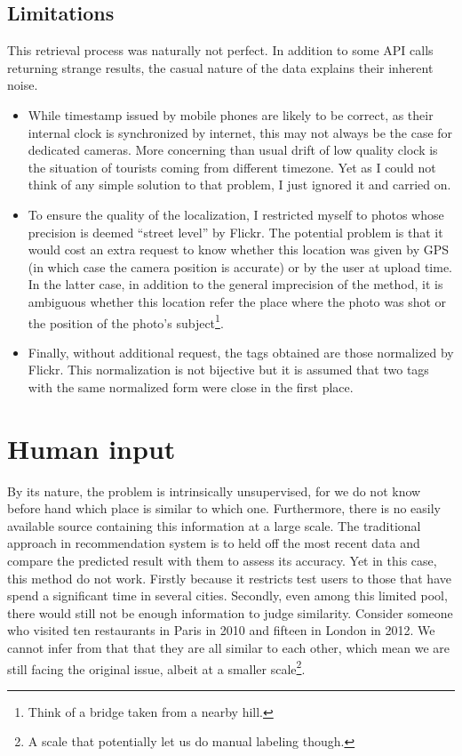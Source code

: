 \subsection{Limitations}

This retrieval process was naturally not perfect. In addition to some API
calls returning strange results, the casual nature of the data explains their
inherent noise.

\begin{itemize}
	\item While timestamp issued by mobile phones are likely to be correct,
 as their internal clock is synchronized by internet, this may not
 always be the case for dedicated cameras. More concerning than usual
 drift of low quality clock is the situation of tourists coming from
 different timezone. Yet as I could not think of any simple solution to
 that problem, I just ignored it and carried on.
	\item To ensure the quality of the localization, I restricted myself to
 photos whose precision is deemed \enquote{street level} by Flickr. The
 potential problem is that it would cost an extra request to know
 whether this location was given by GPS (in which case the camera
 position is accurate) or by the user at upload time. In the latter
 case, in addition to the general imprecision of the method, it is
 ambiguous whether this location refer the place where the photo was
 shot or the position of the photo's subject\footnote{Think of a bridge
 taken from a nearby hill.}.
	\item Finally, without additional request, the tags obtained are those
 normalized by Flickr. This normalization is not bijective but it is
 assumed that two tags with the same normalized form were close in the
 first place.
\end{itemize}

\section{Human input}

By its nature, the problem is intrinsically unsupervised, for we do not know
before hand which place is similar to which one. Furthermore, there is no
easily available source containing this information at a large scale. The
traditional approach in recommendation system is to held off the most recent
data and compare the predicted result with them to assess its accuracy.  Yet
in this case, this method do not work. Firstly because it restricts test users
to those that have spend a significant time in several cities. Secondly, even
among this limited pool, there would still not be enough information to
judge similarity. Consider someone who visited ten restaurants in Paris in
2010 and fifteen in London in 2012. We cannot infer from that that they are
all similar to each other, which mean we are still facing the original issue,
albeit at a smaller scale\footnote{A scale that potentially let us do manual
labeling though.}.

